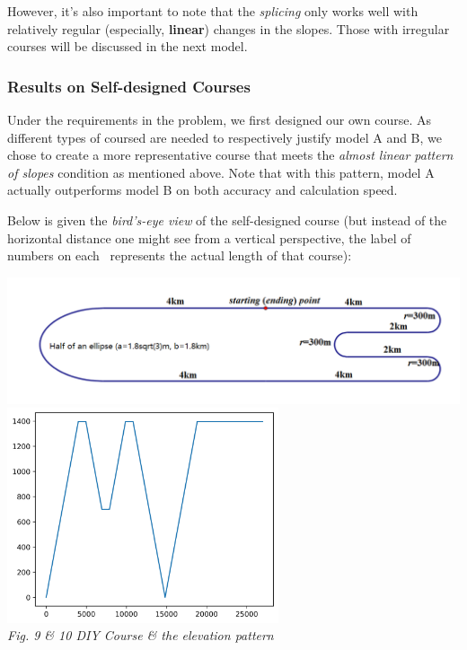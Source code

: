 \documentclass{article}
\begin{document}
			However, it's also important to note that the \textit{splicing} only works well with relatively regular (especially, \textbf{linear}) changes in the slopes. Those with irregular courses will be discussed in the next model.


		\subsubsection{Results on Self-designed Courses}
			Under the requirements in the problem, we first designed our own course. As different types of coursed are needed to respectively justify model A and B, we chose to create a more representative course that meets the \textit{almost linear pattern of slopes} condition as mentioned above. Note that with this pattern, model A actually outperforms model B on both accuracy and calculation speed.

			Below is given the \textit{bird's-eye view} of the self-designed course (but instead of the horizontal distance one might see from a vertical perspective, the label of numbers on each \ represents the actual length of that course):

			\begin{center}
				\includegraphics*[width=15cm]{8.png} \\
				\includegraphics[width=8cm]{diycourse.png}\\

				\small\textit{Fig. 9 \& 10 DIY Course \& the elevation pattern}
			\end{center}
\end{document}

